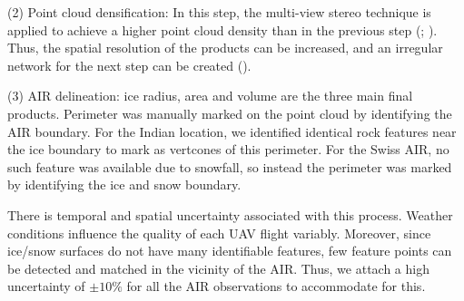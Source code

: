 \documentclass[utf8]{frontiersSCNS}
\begin{document}
(2) Point cloud densification: In this step, the multi-view stereo technique is applied to achieve a higher point
cloud density than in the previous step (\cite{Furukawa_2010}; \cite{Molg_2017}). Thus, the spatial resolution of
the products can be increased, and an irregular network for the next step can be created (\cite{Kung_2011}).

(3) AIR delineation: ice radius, area and volume are the three main final products. Perimeter was manually marked
on the point cloud by identifying the AIR boundary. For the Indian location, we identified identical rock features
near the ice boundary to mark as vertcones of this perimeter. For the Swiss AIR, no such feature was available due
to snowfall, so instead the perimeter was marked by identifying the ice and snow boundary.

There is temporal and spatial uncertainty associated with this process. Weather conditions influence the quality
of each UAV flight variably. Moreover, since ice/snow surfaces do not have many identifiable features, few
feature points can be detected and matched in the vicinity of the AIR. Thus, we attach a high uncertainty of
$\pm 10 \%$ for all the AIR observations to accommodate for this.
\end{document}
